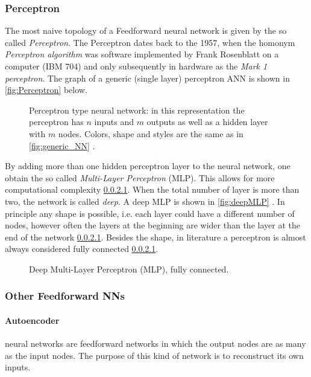 \subsubsection{Perceptron}
\label{sssec:Perceptron}

The most naive topology of a Feedforward neural network is given by the so called \textit{Perceptron}.
The Perceptron dates back to the 1957, when the homonym \textit{Perceptron algorithm} was software implemented by Frank Rosenblatt on a computer (IBM 704) and only subsequently in hardware as the \textit{Mark 1 perceptron}\cite{frank1957perceptron,Rosenblatt1958}.
The graph of a generic (single layer) perceptron ANN is shown in \autoref{fig:Perceptron} below.

\begin{figure}[ht]
	\centering
	
	\caption{%
		Perceptron type neural network: in this representation the perceptron has $n$ inputs and $m$ outputs as well as a hidden layer with $m$ nodes. %
		Colors, shape and styles are the same as in \autoref{fig:generic_NN} .%
		}
	\label{fig:Perceptron}
\end{figure}

By adding more than one hidden perceptron layer to the neural network, one obtain the so called \textit{Multi-Layer Perceptron} (MLP).
This allows for more computational complexity \ref{}.
When the total number of layer is more than two, the network is called \textit{deep}.
A deep MLP is shown in \autoref{fig:deepMLP} .
In principle any shape is possible, i.e. each layer could have a different number of nodes, however often the layers at the beginning are wider than the layer at the end of the network \ref{}.
Besides the shape, in literature a perceptron is almost always considered fully connected \ref{}.

\begin{figure}[ht]
	\centering
	
	\caption{	Deep Multi-Layer Perceptron (MLP), fully connected.}
	\label{fig:deepMLP}
\end{figure}

\subsubsection{Other Feedforward NNs}
\label{sssec:Other_Feedforward_NNs}

\paragraph{Autoencoder} neural networks are feedforward networks in which the output nodes are as many as the input nodes.
The purpose of this kind of network is to reconstruct its own inputs.

